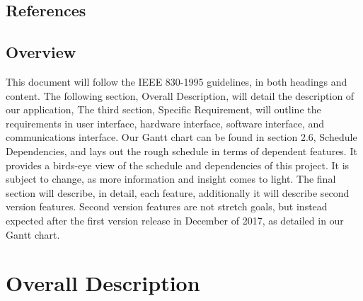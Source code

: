 \documentclass[onecolumn, draftclsnofoot,10pt, compsoc]{IEEEtran}
\begin{document}
\subsection{References}

\subsection{Overview}
This document will follow the IEEE 830-1995 guidelines, in both headings and content.
The following section, Overall Description, will detail the description of our application,
The third section, Specific Requirement, will outline the requirements in user interface, hardware interface, software interface, and communications interface.
Our Gantt chart can be found in section 2.6, Schedule Dependencies, and lays out the rough schedule in terms of dependent features.
It provides a birds-eye view of the schedule and dependencies of this project.
It is subject to change, as more information and insight comes to light.
The final section will describe, in detail, each feature, additionally it will describe second version features.
Second version features are not stretch goals, but instead expected after the first version release in December of 2017, as detailed in our Gantt chart.

\section{Overall Description}
\end{document}
